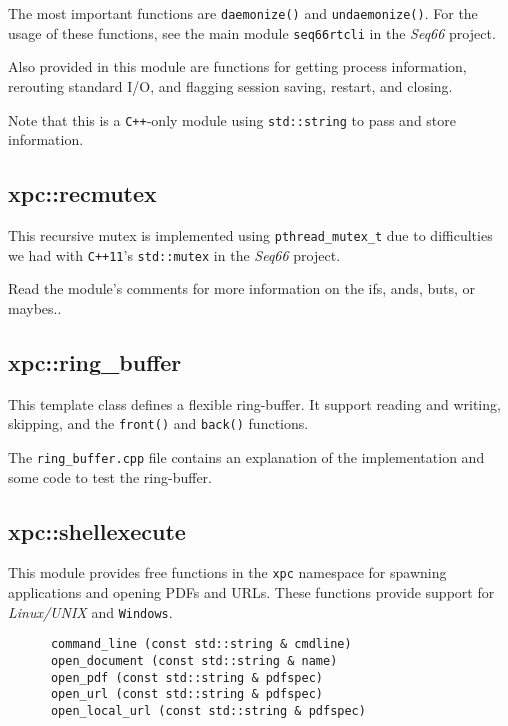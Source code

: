    The most important functions are
   \texttt{daemonize()} and
   \texttt{undaemonize()}.
   For the usage of these functions, see the main module
   \texttt{seq66rtcli} in the \textsl{Seq66} project.

   Also provided in this module are functions for getting process information,
   rerouting standard I/O, and flagging session saving, restart, and closing.

   Note that this is a \texttt{C++}-only module using
   \texttt{std::string} to pass and store information.

\subsection{xpc::recmutex}
\label{subsec:xpc_namespace_recmutex}

   This recursive mutex is implemented using
   \texttt{pthread\_mutex\_t} due to difficulties we had
   with \texttt{C++11}'s \texttt{std::mutex} in the \textsl{Seq66} project.

   Read the module's comments for more information on the ifs, ands, buts, or
   maybes..

\subsection{xpc::ring\_buffer}
\label{subsec:xpc_namespace_ring_buffer}

   This template class defines a flexible ring-buffer.
   It support reading and writing, skipping, and the
   \texttt{front()} and
   \texttt{back()} functions.

   The \texttt{ring\_buffer.cpp} file contains an explanation of the
   implementation and some code to test the ring-buffer.

\subsection{xpc::shellexecute}
\label{subsec:xpc_namespace_shellexecute}

   This module provides free functions in the \texttt{xpc} namespace
   for spawning applications and opening PDFs and URLs.
   These functions provide support for
   \textsl{Linux/UNIX} and \texttt{Windows}.

   \begin{verbatim}
      command_line (const std::string & cmdline)
      open_document (const std::string & name)
      open_pdf (const std::string & pdfspec)
      open_url (const std::string & pdfspec)
      open_local_url (const std::string & pdfspec)
   \end{verbatim}

